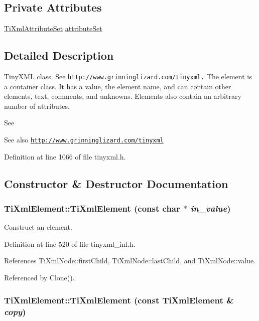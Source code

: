 \subsection*{Private Attributes}
\begin{DoxyCompactItemize}
\item 
\hyperlink{class_ti_xml_attribute_set}{TiXmlAttributeSet} \hyperlink{class_ti_xml_element_a56d7e69380c3cc938bf213d2857791b2}{attributeSet}
\end{DoxyCompactItemize}


\subsection{Detailed Description}
TinyXML class. See \href{http://www.grinninglizard.com/tinyxml.}{\tt http://www.grinninglizard.com/tinyxml.} The element is a container class. It has a value, the element name, and can contain other elements, text, comments, and unknowns. Elements also contain an arbitrary number of attributes.

See \begin{DoxySeeAlso}{See also}
\href{http://www.grinninglizard.com/tinyxml}{\tt http://www.grinninglizard.com/tinyxml} 
\end{DoxySeeAlso}


Definition at line 1066 of file tinyxml.h.

\subsection{Constructor \& Destructor Documentation}
\hypertarget{class_ti_xml_element_a01bc3ab372d35da08efcbbe65ad90c60}{
\subsubsection[{TiXmlElement}]{\setlength{\rightskip}{0pt plus 5cm}TiXmlElement::TiXmlElement (const char $\ast$ {\em in\_\-value})}}
\label{class_ti_xml_element_a01bc3ab372d35da08efcbbe65ad90c60}


Construct an element. 

Definition at line 520 of file tinyxml\_\-inl.h.

References TiXmlNode::firstChild, TiXmlNode::lastChild, and TiXmlNode::value.

Referenced by Clone().\hypertarget{class_ti_xml_element_a1ca4465f3c2eac6a60e641cd7f1d9f7e}{
\subsubsection[{TiXmlElement}]{\setlength{\rightskip}{0pt plus 5cm}TiXmlElement::TiXmlElement (const {\bf TiXmlElement} \& {\em copy})}}
\label{class_ti_xml_element_a1ca4465f3c2eac6a60e641cd7f1d9f7e}


